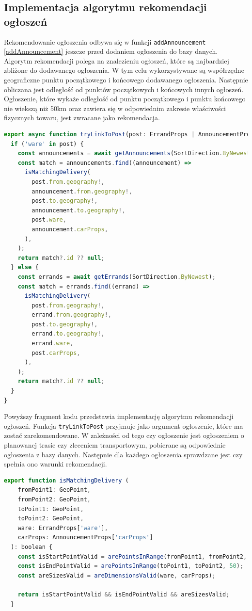 \subsection{Implementacja algorytmu rekomendacji ogłoszeń}

Rekomendowanie ogłoszenia odbywa się w funkcji \texttt{addAnnouncement} \ref{addAnnouncement} jeszcze przed dodaniem ogłoszenia do bazy danych. Algorytm rekomendacji polega na znalezieniu ogłoszeń, które są najbardziej zbliżone do dodawanego ogłoszenia. W tym celu wykorzystywane są współrzędne geograficzne punktu początkowego i końcowego dodawanego ogłoszenia. Następnie obliczana jest odległość od punktów początkowych i końcowych innych ogłoszeń. Ogłoszenie, które wykaże odległość od punktu początkowego i punktu końcowego nie wiekszą niż 50km oraz zawiera się w odpowiednim zakresie właściwości fizycznych towaru, jest zwracane jako rekomendacja.

{\belowcaptionskip=-9pt 
\begin{lstlisting}[language=JavaScript,caption=Implementacja rekomendacji ogłoszeń, label=lst:recomendPost]
  export async function tryLinkToPost(post: ErrandProps | AnnouncementProps): Promise<string | null> {
  if ('ware' in post) {
    const announcements = await getAnnouncements(SortDirection.ByNewest);
    const match = announcements.find((announcement) =>
      isMatchingDelivery(
        post.from.geography!,
        announcement.from.geography!,
        post.to.geography!,
        announcement.to.geography!,
        post.ware,
        announcement.carProps,
      ),
    );
    return match?.id ?? null;
  } else {
    const errands = await getErrands(SortDirection.ByNewest);
    const match = errands.find((errand) =>
      isMatchingDelivery(
        post.from.geography!,
        errand.from.geography!,
        post.to.geography!,
        errand.to.geography!,
        errand.ware,
        post.carProps,
      ),
    );
    return match?.id ?? null;
  }
}
\end{lstlisting}
}

Powyższy fragment kodu przedstawia implementację algorytmu rekomendacji ogłoszeń. Funkcja \texttt{tryLinkToPost} przyjmuje jako argument ogłoszenie, które ma zostać zarekomendowane. W zależności od tego czy ogłoszenie jest ogłoszeniem o planowanej trasie czy zleceniem transportowym, pobierane są odpowiednie ogłoszenia z bazy danych. Następnie dla każdego ogłoszenia sprawdzane jest czy spełnia ono warunki rekomendacji.

{\belowcaptionskip=-9pt
\begin{lstlisting}[language=JavaScript,caption=Funkcja sprawdzająca warunki powiązania ogłoszeń, label=lst:isMatchingDelivery]
    export function isMatchingDelivery (
    fromPoint1: GeoPoint,
    fromPoint2: GeoPoint,
    toPoint1: GeoPoint,
    toPoint2: GeoPoint,
    ware: ErrandProps['ware'],
    carProps: AnnouncementProps['carProps']
  ): boolean {
    const isStartPointValid = arePointsInRange(fromPoint1, fromPoint2, 50);
    const isEndPointValid = arePointsInRange(toPoint1, toPoint2, 50);
    const areSizesValid = areDimensionsValid(ware, carProps);

    return isStartPointValid && isEndPointValid && areSizesValid;
  }
\end{lstlisting}
}

